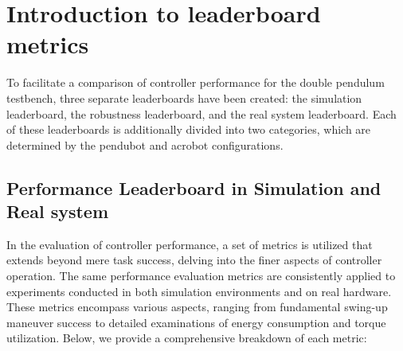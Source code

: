 \section{Introduction to leaderboard metrics}
To facilitate a comparison of controller performance for the double pendulum testbench, three separate leaderboards have been created: the simulation leaderboard, the robustness leaderboard, and the real system leaderboard\cite{2023_ram_wiebe_double_pendulum}. Each of these leaderboards is additionally divided into two categories, which are determined by the pendubot and acrobot configurations.

\subsection{Performance Leaderboard in Simulation and Real system}
In the evaluation of controller performance, a set of metrics is utilized that extends beyond mere task success, delving into the finer aspects of controller operation. The same performance evaluation metrics are consistently applied to experiments conducted in both simulation environments and on real hardware. These metrics encompass various aspects, ranging from fundamental swing-up maneuver success to detailed examinations of energy consumption and torque utilization. Below, we provide a comprehensive breakdown of each metric:

